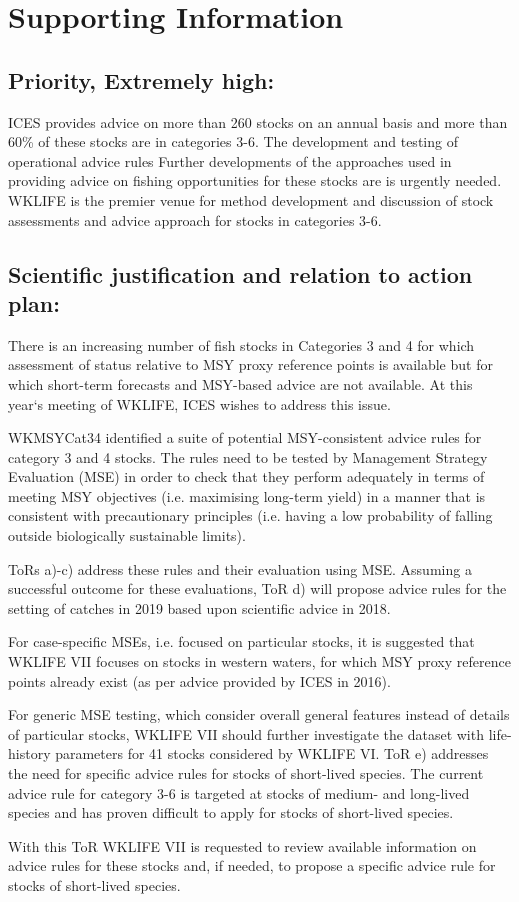 \documentclass[a4paper,10pt]{article}
\begin{document}
\section*{Supporting Information}

\subsection*{Priority, Extremely high:} 

ICES provides advice on more than 260 stocks on an annual basis and more than 60\% of these stocks are in categories 3-6. The development and testing of operational advice rules Further developments of the approaches used in providing advice on fishing opportunities for these stocks are is urgently needed. WKLIFE is the premier venue for method development and discussion of stock assessments and advice approach for stocks in categories 3-6.

\subsection*{Scientific justification and relation to action plan:}

There is an increasing number of fish stocks in Categories 3 and 4 for which assessment of status relative to MSY proxy reference points is available but for which short-term forecasts and MSY-based advice are not available.  At this year‘s meeting of WKLIFE, ICES wishes to address this issue.

WKMSYCat34 identified a suite of potential MSY-consistent advice rules for category 3 and 4 stocks. The rules need to be tested by Management Strategy Evaluation (MSE) in order to check that they perform adequately in terms of meeting MSY objectives (i.e. maximising long-term yield) in a manner that is consistent with precautionary principles (i.e. having a low probability of falling outside biologically sustainable limits).

ToRs a)-c) address these rules and their evaluation using MSE.  Assuming a successful outcome for these evaluations, 
ToR d) will propose advice rules for the setting of catches in 2019 based upon scientific advice in 2018.

For case-specific MSEs, i.e. focused on particular stocks, it is suggested that WKLIFE VII focuses on stocks in western waters, for which MSY proxy reference points already exist (as per advice provided by ICES in 2016).  

For generic MSE testing, which consider overall general features instead of details of particular stocks, WKLIFE VII should further investigate the dataset with life-history parameters for 41 stocks considered by WKLIFE VI. ToR e) addresses the need for specific advice rules for stocks of short-lived species. The current advice rule for category 3-6 is targeted at stocks of medium- and long-lived species and has proven difficult to apply for stocks of short-lived species. 

With this ToR WKLIFE VII is requested to review available information on advice rules for these stocks and, if needed, to propose a specific advice rule for stocks of short-lived species.
\end{document}
